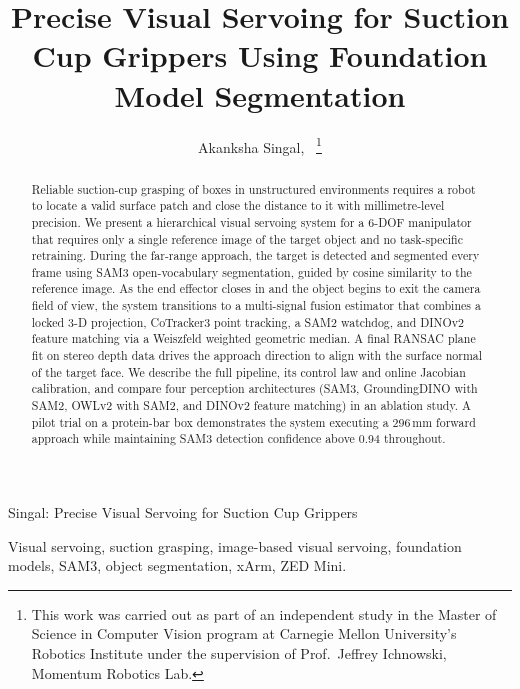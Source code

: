 \documentclass[lettersize,journal]{IEEEtran}
\begin{document}
\title{Precise Visual Servoing for Suction Cup Grippers Using Foundation Model Segmentation}

\author{Akanksha Singal,~
\thanks{This work was carried out as part of an independent study in the Master of Science
in Computer Vision program at Carnegie Mellon University's Robotics Institute under the
supervision of Prof.\ Jeffrey Ichnowski, Momentum Robotics Lab.}}

%
{Singal: Precise Visual Servoing for Suction Cup Grippers}

\maketitle

\begin{abstract}
Reliable suction-cup grasping of boxes in unstructured environments requires a
robot to locate a valid surface patch and close the distance to it with
millimetre-level precision.  We present a hierarchical visual servoing system
for a 6-DOF manipulator that requires only a single reference image of the
target object and no task-specific retraining.  During the far-range
approach, the target is detected and segmented every frame using
SAM3 open-vocabulary segmentation, guided by cosine similarity to the
reference image.  As the end effector closes in and the object begins to
exit the camera field of view, the system transitions to a multi-signal
fusion estimator that combines a locked 3-D projection, CoTracker3 point
tracking, a SAM2 watchdog, and DINOv2 feature matching via a
Weiszfeld weighted geometric median.  A final RANSAC plane fit on
stereo depth data drives the approach direction to align with the surface
normal of the target face.  We describe the full pipeline, its control
law and online Jacobian calibration, and compare four perception
architectures (SAM3, GroundingDINO with SAM2, OWLv2 with SAM2, and
DINOv2 feature matching) in an ablation study.  A pilot trial on a
protein-bar box demonstrates the system executing a 296\,mm forward
approach while maintaining SAM3 detection confidence above 0.94 throughout.
\end{abstract}

\begin{IEEEkeywords}
Visual servoing, suction grasping, image-based visual servoing, foundation models,
SAM3, object segmentation, xArm, ZED Mini.
\end{IEEEkeywords}
\end{document}
